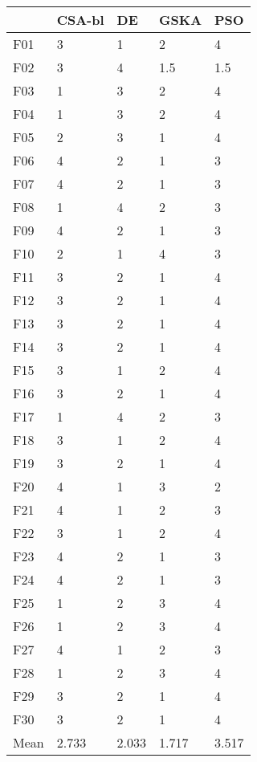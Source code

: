 \begin{tabular}{lllll}
\toprule
{} & CSA-bl &     DE &   GSKA &    PSO \\
\midrule
F01  &      3 &      1 &      2 &      4 \\
F02  &      3 &      4 &    1.5 &    1.5 \\
F03  &      1 &      3 &      2 &      4 \\
F04  &      1 &      3 &      2 &      4 \\
F05  &      2 &      3 &      1 &      4 \\
F06  &      4 &      2 &      1 &      3 \\
F07  &      4 &      2 &      1 &      3 \\
F08  &      1 &      4 &      2 &      3 \\
F09  &      4 &      2 &      1 &      3 \\
F10  &      2 &      1 &      4 &      3 \\
F11  &      3 &      2 &      1 &      4 \\
F12  &      3 &      2 &      1 &      4 \\
F13  &      3 &      2 &      1 &      4 \\
F14  &      3 &      2 &      1 &      4 \\
F15  &      3 &      1 &      2 &      4 \\
F16  &      3 &      2 &      1 &      4 \\
F17  &      1 &      4 &      2 &      3 \\
F18  &      3 &      1 &      2 &      4 \\
F19  &      3 &      2 &      1 &      4 \\
F20  &      4 &      1 &      3 &      2 \\
F21  &      4 &      1 &      2 &      3 \\
F22  &      3 &      1 &      2 &      4 \\
F23  &      4 &      2 &      1 &      3 \\
F24  &      4 &      2 &      1 &      3 \\
F25  &      1 &      2 &      3 &      4 \\
F26  &      1 &      2 &      3 &      4 \\
F27  &      4 &      1 &      2 &      3 \\
F28  &      1 &      2 &      3 &      4 \\
F29  &      3 &      2 &      1 &      4 \\
F30  &      3 &      2 &      1 &      4 \\
Mean &  2.733 &  2.033 &  1.717 &  3.517 \\
\bottomrule
\end{tabular}
